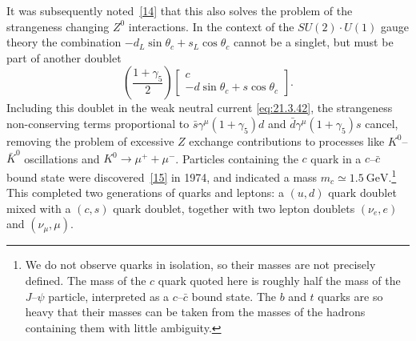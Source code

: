 It was subsequently noted~\hyperref[ch21-ref-14]{[14]} that this also solves the problem of the strangeness changing $Z^0$ interactions. In the context of the $SU(2)\cdot U(1)$ gauge theory the combination $-d_L\sin\theta_c+s_L\cos\theta_c$ cannot be a singlet, but must be part of another doublet
\begin{equation}
\left(\frac{1+\gamma_5}{2}\right)
\begin{bmatrix}
c\\
-d\sin\theta_c+s\cos\theta_c
\end{bmatrix}.
\tag{21.3.44}\label{eq:21.3.44}
\end{equation}
Including this doublet in the weak neutral current \eqref{eq:21.3.42}, the strangeness non-conserving terms proportional to $\bar s\gamma^\mu(1+\gamma_5)d$ and $\bar d\gamma^\mu(1+\gamma_5)s$ cancel, removing the problem of excessive $Z$ exchange contributions to processes like $K^0$--$\bar K^0$ oscillations and $K^0\to\mu^++\mu^-$. Particles containing the $c$ quark in a $c$--$\bar c$ bound state were discovered~\hyperref[ch21-ref-15]{[15]} in 1974, and indicated a mass $m_c\simeq1.5\ \mathrm{GeV}$.\footnote{We do not observe quarks in isolation, so their masses are not precisely defined. The mass of the $c$ quark quoted here is roughly half the mass of the $J$--$\psi$ particle, interpreted as a $c$--$\bar c$ bound state. The $b$ and $t$ quarks are so heavy that their masses can be taken from the masses of the hadrons containing them with little ambiguity.} This completed two generations of quarks and leptons: a $(u,d)$ quark doublet mixed with a $(c,s)$ quark doublet, together with two lepton doublets $(\nu_e,e)$ and $(\nu_\mu,\mu)$.

